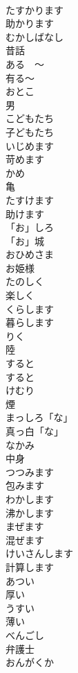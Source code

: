 \documentclass[8pt]{extreport}
\begin{document}
\begin{CJK}{UTF8}{min}
\\	たすかります	
\\	助かります		
\\	むかしばなし	
\\	昔話		
\\	ある　〜	
\\	有る〜		
\\	おとこ	
\\	男		
\\	こどもたち	
\\	子どもたち		
\\	いじめます	
\\	苛めます		
\\	かめ	
\\	亀		
\\	たすけます	
\\	助けます		
\\	「お」しろ	
\\	「お」城		
\\	おひめさま	
\\	お姫様		
\\	たのしく	
\\	楽しく		
\\	くらします	
\\	暮らします		
\\	りく	
\\	陸		
\\	すると	
\\	すると		
\\	けむり	
\\	煙		
\\	まっしろ「な」	
\\	真っ白「な」		
\\	なかみ	
\\	中身		
\\	つつみます	
\\	包みます		
\\	わかします	
\\	沸かします	
\\	まぜます	
\\	混ぜます		
\\	けいさんします	
\\	計算します	
\\	あつい	
\\	厚い		
\\	うすい	
\\	薄い		
\\	べんごし	
\\	弁護士		
\\	おんがくか	

\end{CJK}
\end{document}
